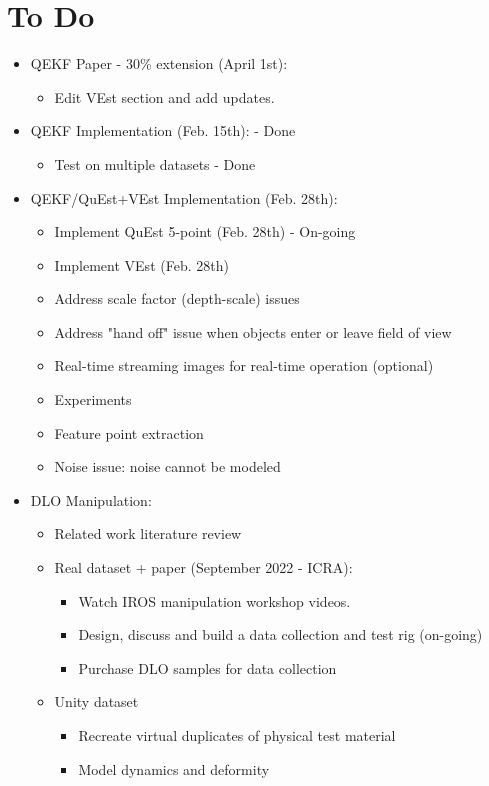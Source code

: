 \documentclass[11pt]{article}
\begin{document}
\section{To Do}
\begin{itemize}
  \item QEKF Paper - 30\% extension (April 1st):
  \begin{itemize}
      \item Edit VEst section and add updates.
  \end{itemize}
  \item QEKF Implementation (Feb. 15th): - Done
  \begin{itemize}
      \item Test on multiple datasets - Done
  \end{itemize}
  \item QEKF/QuEst+VEst Implementation (Feb. 28th):
  \begin{itemize}
      \item Implement QuEst 5-point (Feb. 28th) - On-going
      \item Implement VEst (Feb. 28th)
      \item Address scale factor (depth-scale) issues
      \item Address "hand off" issue when objects enter or leave field of view
      \item Real-time streaming images for real-time operation (optional)
      \item Experiments
      \item Feature point extraction
      \item Noise issue: noise cannot be modeled
  \end{itemize}
  \item  DLO Manipulation:
  \begin{itemize}
      \item Related work literature review
      \item Real dataset + paper (September 2022 - ICRA):
      \begin{itemize}
            \item Watch IROS manipulation workshop videos.
            \item Design, discuss and build a data collection and test rig (on-going)
            \item Purchase DLO samples for data collection
      \end{itemize}
      \item Unity dataset
      \begin{itemize}
            \item Recreate virtual duplicates of physical test material
            \item Model dynamics and deformity
      \end{itemize}
  \end{itemize}
\end{itemize}
\end{document}
